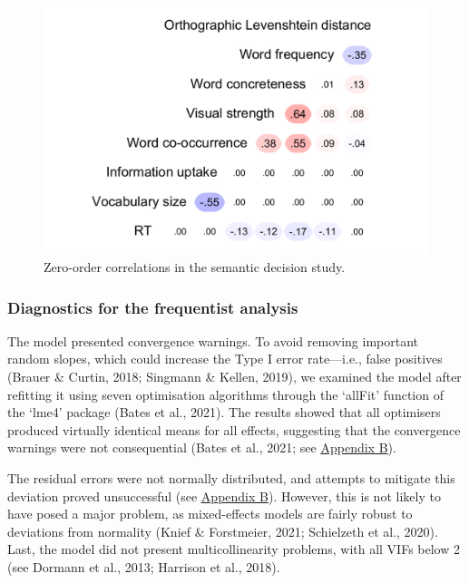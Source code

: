 \documentclass[
  12pt,
  man,floatsintext]{apa7}
\begin{document}
\begin{figure}

{\centering \includegraphics[width=0.61\linewidth]{thesis-core_files/figure-latex/semanticdecision-correlations-1} 

}

\caption{Zero-order correlations in the semantic decision study.}\label{fig:semanticdecision-correlations}
\end{figure}

\hypertarget{diagnostics-for-the-frequentist-analysis-2}{%
\subsubsection{Diagnostics for the frequentist analysis}\label{diagnostics-for-the-frequentist-analysis-2}}

The model presented convergence warnings. To avoid removing important random slopes, which could increase the Type I error rate---i.e., false positives (Brauer \& Curtin, 2018; Singmann \& Kellen, 2019), we examined the model after refitting it using seven optimisation algorithms through the `allFit' function of the `lme4' package (Bates et al., 2021). The results showed that all optimisers produced virtually identical means for all effects, suggesting that the convergence warnings were not consequential (Bates et al., 2021; see \protect\hyperlink{appendix-B-frequentist-analysis-diagnostics}{\underline{Appendix B}}).

The residual errors were not normally distributed, and attempts to mitigate this deviation proved unsuccessful (see \protect\hyperlink{appendix-B-frequentist-analysis-diagnostics}{\underline{Appendix B}}). However, this is not likely to have posed a major problem, as mixed-effects models are fairly robust to deviations from normality (Knief \& Forstmeier, 2021; Schielzeth et al., 2020). Last, the model did not present multicollinearity problems, with all VIFs below 2 (see Dormann et al., 2013; Harrison et al., 2018).
\end{document}
